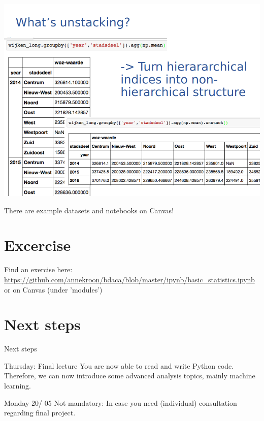 \documentclass[handout]{beamer}
\begin{document}
{\begin{frame}[plain]
{	\includegraphics[width=\paperwidth,height=\paperheight,keepaspectratio]{../../pictures/pandas-example5.png}}
\end{frame}
}


\begin{frame}
There are example datasets and notebooks on Canvas!
\end{frame}

\section{Excercise}
\begin{frame}{}
Find an exercise here: \url{https://github.com/annekroon/bdaca/blob/master/ipynb/basic_statistics.ipynb}
or on Canvas (under 'modules')
\end{frame}




\section{Next steps}
\begin{frame}{Next steps}
\begin{block}{Thursday: Final lecture}
You are now able to read and write Python code. Therefore, we can now introduce some advanced analysis topics, mainly machine learning.
\end{block}

\begin{block}{Monday 20/ 05 }
Not mandatory: In case you need (individual) consultation regarding final project.
\end{block}
\end{frame}
\end{document}
